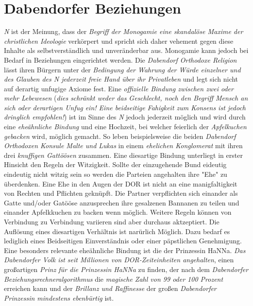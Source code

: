 \section{{Dabendorfer Beziehungen}}
\textit{N} ist der Meinung, dass der \textit{Begriff der Monogamie eine skandalöse Maxime der christlichen Ideologie} verkörpert und spricht sich daher vehement gegen diese Inhalte als selbstverständlich und unveränderbar aus. Monogamie kann jedoch bei Bedarf in Beziehungen eingerichtet werden. Die \textit{Dabendorf Orthodoxe Religion} lässt ihren Bürgern unter der \textit{Bedingung der Wahrung der Würde einzelner und des Glauben des \textit{N} jederzeit freie Hand über ihr Privatleben} und legt sich nicht auf derartig unfugige Axiome fest. Eine \textit{offizielle Bindung zwischen zwei oder mehr Lebewesen} (\textit{dies schränkt weder das Geschlecht, noch den Begriff Mensch an sich oder derartigen Unfug ein! Eine beidseitige Fahigkeit zum Konsens ist jedoch dringlich empfohlen!}) ist im Sinne des \textit{N} jedoch jederzeit möglich und wird durch eine \textit{eheähnliche Bindung} und eine Hochzeit, bei welcher feierlich der \textit{Apfelkuchen gebacken} wird, möglich gemacht. So leben beispielsweise die beiden \textit{Dabendorf Orthodoxen Konsule Malte und Lukas} in einem \textit{ehelichen Konglomerat} mit ihren drei \textit{knuffigen Gattöösen} zusammen. Eine diesartige Bindung unterliegt in erster Hinsicht den Regeln der Witzigkeit. Sollte der einzugehende Bund eideutig eindeutig nicht witzig sein so werden die Parteien angehalten ihre "Ehe" zu überdenken. Eine Ehe in den Augen der DOR ist nicht an eine manigfaltigkeit von Rechten und Pflichten geknüpft. Die Partner verpflichten sich einander als Gatte und/oder Gatööse anzusprechen ihre gesalzenen Bannanen zu teilen und einander Apfelkkuchen zu backen wenn möglich. Weitere Regeln können von Verbindung zu Verbindung variieren sind aber durchaus aktzeptiert. Die Auflösung eines diesartigen Verhältnis ist narürlich Möglich. Dazu bedarf es lediglich eines Beidseitigen Einverständnis oder einer päpstlichen Genehmigung. Eine besonders relevante eheähnliche Bindung ist die der Prinzessin HaNNa.  \textit{ Das Dabendorfer Volk ist seit Millionen von DOR-Zeiteinheiten angehalten}, einen großartigen \textit{Prinz für die Prinzessin HaNNa} zu finden, der nach dem \textit{Dabendorfer Beziehungsrechneralgorithmus} die \textit{magische Zahl von 99 oder 100 Prozent} erreichen kann und der \textit{Brillanz und Raffinesse} der großen \textit{Dabendorfer Prinzessin mindestens ebenbürtig} ist.

